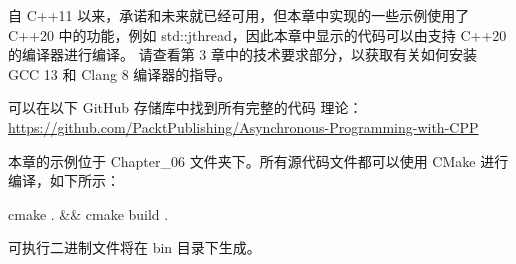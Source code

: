 

自 C++11 以来，承诺和未来就已经可用，但本章中实现的一些示例使用了 C++20 中的功能，例如 std::jthread，因此本章中显示的代码可以由支持 C++20 的编译器进行编译。
请查看第 3 章中的技术要求部分，以获取有关如何安装 GCC 13 和 Clang 8 编译器的指导。

可以在以下 GitHub 存储库中找到所有完整的代码 理论： \url{https://github.com/PacktPublishing/Asynchronous-Programming-with-CPP}

本章的示例位于 Chapter\_06 文件夹下。所有源代码文件都可以使用 CMake 进行编译，如下所示：

\begin{shell}
cmake . && cmake build .
\end{shell}

可执行二进制文件将在 bin 目录下生成。

